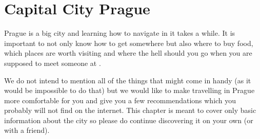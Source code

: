 \section{Capital City Prague}
Prague is a big city and learning how to navigate in it takes a while. It is
important to not only know how to get somewhere but also where to buy food,
which places are worth visiting and where the hell should you go when you are
supposed to meet someone at .

We do not intend to mention all of the things that might come in handy (as it
would be impossible to do that) but we would like to make travelling in Prague
more comfortable for you and give you a few recommendations which you probably
will not find on the internet.
This chapter is meant to cover only basic information about the city so please
do continue discovering it on your own (or with a friend).